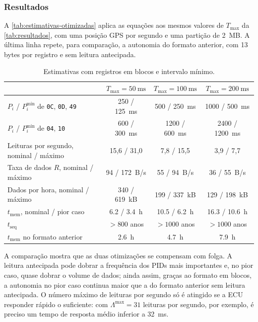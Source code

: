 \documentclass[12pt]{article}
\begin{document}
\subsubsection{Resultados}
 
A \autoref{tab:estimativas-otimizadas} aplica as equações aos mesmos valores de $T_{\max}$ da \autoref{tab:resultados}, com uma posição GPS por segundo e uma partição de \SI{2}{MB}. A última linha repete, para comparação, a autonomia do formato anterior, com 13 bytes por registro e sem leitura antecipada.
 
\begin{table}[htbp]
  \centering
  \caption{Estimativas com registros em blocos e intervalo mínimo.}
  \label{tab:estimativas-otimizadas}
  \begin{tabular}{lccc}
    \toprule
    & $T_{\max} = \SI{50}{\milli\second}$ & $T_{\max} = \SI{100}{\milli\second}$ & $T_{\max} = \SI{200}{\milli\second}$ \\
    \midrule
    $P_i$ / $P_i^{\min}$ de \texttt{0C}, \texttt{0D}, \texttt{49} & \num{250} / \SI{125}{\milli\second} & \num{500} / \SI{250}{\milli\second} & \num{1000} / \SI{500}{\milli\second} \\
    $P_i$ / $P_i^{\min}$ de \texttt{04}, \texttt{10}              & \num{600} / \SI{300}{\milli\second} & \num{1200} / \SI{600}{\milli\second} & \num{2400} / \SI{1200}{\milli\second} \\
    \midrule
    Leituras por segundo, nominal / máximo & 15{,}6 / 31{,}0 & 7{,}8 / 15{,}5 & 3{,}9 / 7{,}7 \\
    Taxa de dados $R$, nominal / máximo    & \num{94} / \SI{172}{B/s} & \num{55} / \SI{94}{B/s} & \num{36} / \SI{55}{B/s} \\
    Dados por hora, nominal / máximo       & \num{340} / \SI{619}{kB} & \num{199} / \SI{337}{kB} & \num{129} / \SI{198}{kB} \\
    $t_{\mathrm{mem}}$, nominal / pior caso & \SI{6.2}{} / \SI{3.4}{h} & \SI{10.5}{} / \SI{6.2}{h} & \SI{16.3}{} / \SI{10.6}{h} \\
    $t_{\mathrm{seq}}$                      & $> 800$ anos & $> 1000$ anos & $> 1000$ anos \\
    \midrule
    $t_{\mathrm{mem}}$ no formato anterior  & \SI{2.6}{h} & \SI{4.7}{h} & \SI{7.9}{h} \\
    \bottomrule
  \end{tabular}
\end{table}
 
A comparação mostra que as duas otimizações se compensam com folga. A leitura antecipada pode dobrar a frequência dos PIDs mais importantes e, no pior caso, quase dobrar o volume de dados; ainda assim, graças ao formato em blocos, a autonomia no pior caso continua maior que a do formato anterior sem leitura antecipada. O número máximo de leituras por segundo só é atingido se a ECU responder rápido o suficiente: com $\Lambda^{\max} = 31$ leituras por segundo, por exemplo, é preciso um tempo de resposta médio inferior a \SI{32}{\milli\second}.
\end{document}
